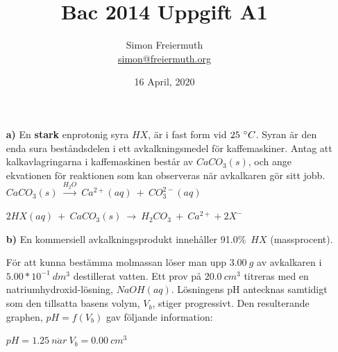 \documentclass[12pt, letterpaper, twoside]{article}
\title{Bac 2014 Uppgift A1}
\author{Simon Freiermuth \\ \href{mailto:simon@freiermuth.org}{simon@freiermuth.org}}
\date{16 April, 2020}
\begin{document}
\maketitle

\begin{flushleft}

\begin{itemize}
%
\item[\textbf{a)}]En \textbf{stark} enprotonig syra $ HX $, är i fast form vid $ 25\ \degree C $.
Syran är den enda sura beståndsdelen i ett avkalkningsmedel för kaffemaskiner.
Antag att kalkavlagringarna i kaffemaskinen består av $ CaCO_3(s) $,
och ange ekvationen för reaktionen som kan observeras när avkalkaren gör sitt jobb.
\newline
\newline
$ CaCO_3(s)\ \overset{H_2O}{\rightarrow}\ Ca^{2+}(aq)\ +\ CO_3^{2-}(aq) $

$ 2HX(aq)\ +\ CaCO_3(s)\ \rightarrow\ H_2CO_3\ +\ Ca^{2+} + 2X^- $
\newline
\item[\textbf{b)}]En kommersiell avkalkningsprodukt innehåller 91.0\%\ $ HX $ (massprocent).

För att kunna bestämma molmassan löser man upp $ 3.00\ g $ av avkalkaren i $ 5.00*10^{-1}\ dm^3 $ destillerat vatten.
Ett prov på $ 20.0\ cm^3 $ titreras med en natriumhydroxid-lösning,
$ NaOH(aq) $. Lösningens pH antecknas samtidigt som den tillsatta basens volym, $ V_b $, stiger progressivt.
\newline
\newline
Den resulterande graphen, $ pH=f(V_b) $ gav följande information:\\
\begin{addmargin}[1em]{2em}%
    $ pH = 1.25\ n\ddot{a}r\ V_b = 0.00\ cm^3 $


\end{addmargin}
\end{itemize}
\end{flushleft}
\end{document}
